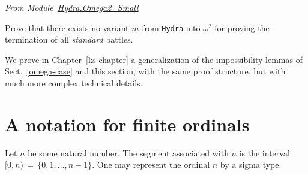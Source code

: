 \vspace{4pt}
\noindent
\emph{From Module~\href{../theories/html/hydras.Hydra.Omega2_Small.html\#Impossible}{Hydra.Omega2\_Small}}


  


\begin{exercise}
Prove that there exists no variant $m$ from \texttt{Hydra} into $\omega^2$ for proving
    the  termination of all \emph{standard} battles.
\end{exercise}



\begin{remark}
 We  prove in Chapter~\ref{ks-chapter} a generalization of the impossibility lemmas of
Sect.~\ref{omega-case} and this section, with the same proof structure, but with much more 
complex technical details.
 \end{remark}





  


\section{A notation for finite ordinals}


Let $n$ be some natural number. The segment associated with $n$ is the interval 
$[0,n)\,=\,\{0,1,\dots,n-1\}$. 
One may represent the ordinal $n$ by a sigma type.


